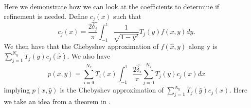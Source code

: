 \documentclass{article}
\begin{document}
Here we demonstrate how we can look at the coefficients to determine if refinement is needed. Define $c_j(x)$ such that
 \begin{equation}
 	c_j(x) = \frac{2 \hat{\delta_j}}{\pi} \int_{-1}^{1} \frac{1}{\sqrt{1-y^2}}T_j(y)f(x,y)dy.
\end{equation}
We then have that the Chebyshev approximation of $f(\hat{x},y)$ along y is $\sum_{j=1}^{N_y} T_j(y)c_j(\hat{x})$. We also have
\begin{equation}
p(x,y) = \sum_{i=0}^{N_x} T_i(x) \int_{-1}^{1} \frac{2 \hat{\delta_i}}{\pi}  \sum_{j=0}^{N_y}T_j(y)c_j(x) dx
\label{fixed_x}
\end{equation}
implying $p(x,\hat{y})$ is the Chebyshev approximation of $\sum_{j=1}^{N_y} T_j(\hat{y})c_j(x)$. Here we take an idea from a theorem in \cite{sommariva2005adaptive}.
\end{document}
